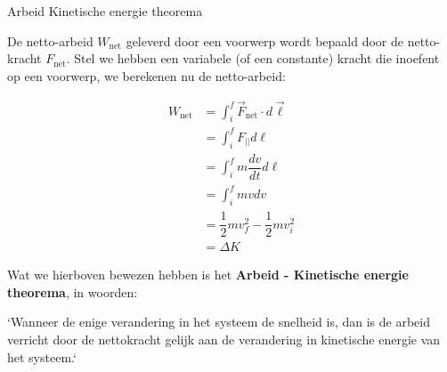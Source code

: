 \newpage

\begin{lem}{Arbeid Kinetische energie theorema}

De netto-arbeid $ W_{\text{net}} $ geleverd door een voorwerp wordt bepaald door de netto-kracht $ F_{\text{net}} $. Stel we hebben een variabele (of een constante) kracht die inoefent op een voorwerp, we berekenen nu de netto-arbeid:

\vspace{-0.6cm}
\begin{align*}
    W_{\text{net}} &= \int_i^f \Vec{F}_{\text{net}} \cdot d\Vec{\ell} \\
            &= \int_i^f F_{||}d\ell \\
            &= \int_i^f m\dfrac{dv}{dt}d\ell \\
            &= \int_i^f mvdv  \\
            &= \dfrac{1}{2}mv_f^2 - \dfrac{1}{2}mv_i^2 \\
            &= \Delta K 
\end{align*}

\noindent Wat we hierboven bewezen hebben is het \textbf{Arbeid - Kinetische energie theorema}, in woorden: 

\vspace{0.3cm} \noindent  `Wanneer de enige verandering in het systeem de snelheid is, dan is de arbeid verricht door de nettokracht gelijk aan de verandering in kinetische energie van het systeem.`

\end{lem}
